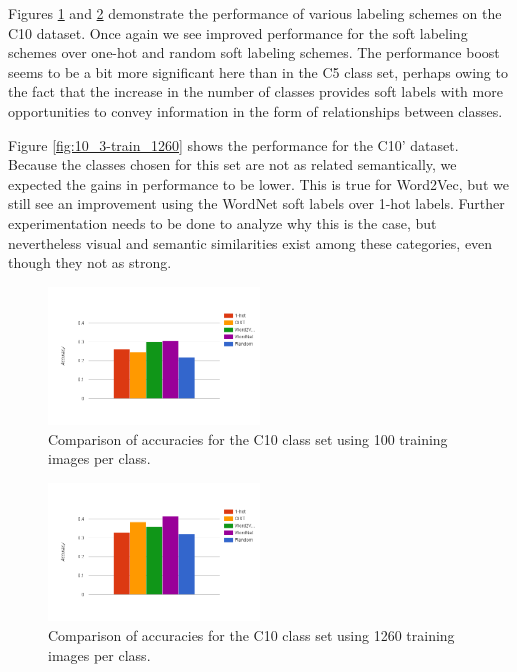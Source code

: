 Figures \ref{fig:10_1-train_100} and \ref{fig:10_1-train_1260} demonstrate the
performance of various labeling schemes on the C10 dataset. Once again we see
improved performance for the soft labeling schemes over one-hot and random soft
labeling schemes. The performance boost seems to be a bit more significant here
than in the C5 class set, perhaps owing to the fact that the increase in the
number of classes provides soft labels with more opportunities to convey
information in the form of relationships between classes.

Figure \ref{fig:10_3-train_1260} shows the performance for the C10' dataset.
Because the classes chosen for this set are not as related semantically, we
expected the gains in performance to be lower. This is true for Word2Vec, but
we still see an improvement using the WordNet soft labels over 1-hot labels.
Further experimentation needs to be done to analyze why this is the case, but
nevertheless visual and semantic similarities exist among these categories,
even though they not as strong.

\begin{figure}[!tb]
  \centering
  \includegraphics[width=0.5\textwidth]{figs/10_1-train_100.png}
  \caption{
      Comparison of accuracies for the C10 class set using 100 training images
      per class.
  }
  \label{fig:10_1-train_100}
\end{figure}

\begin{figure}[!tb]
  \centering
  \includegraphics[width=0.5\textwidth]{figs/10_1-train_1260.png}
  \caption{
      Comparison of accuracies for the C10 class set using 1260 training images
      per class.
  }
  \label{fig:10_1-train_1260}
\end{figure}

